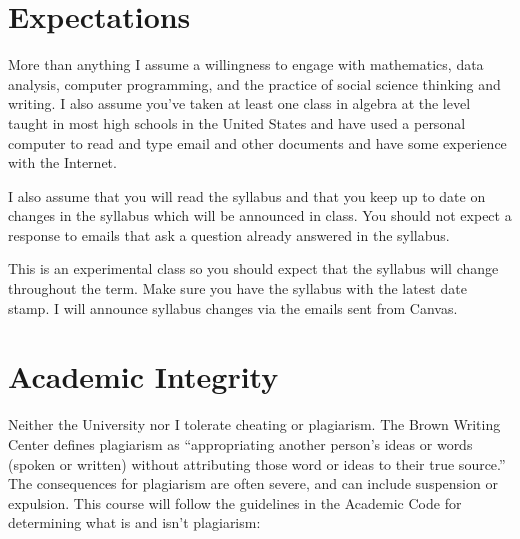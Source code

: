 \section{Expectations}

More than anything I assume a willingness to engage with mathematics, data analysis, computer programming, and the practice of social science thinking and writing. I also assume you've taken at least one class in algebra at the level taught in most high schools in the United States and have used a personal computer to read and type email and other documents and have some experience with the Internet. 

I also assume that you will read the syllabus and that you keep up to date on changes in the syllabus which will be announced in class. You should not expect a response to emails that ask a question already answered in the syllabus. 

This is an experimental class so you should expect that the syllabus will change throughout the term. Make sure you have the syllabus with the latest date stamp. I will announce syllabus changes via the emails sent from Canvas. 


\section{Academic Integrity}

Neither the University nor I tolerate cheating or plagiarism. The Brown Writing Center defines plagiarism as ``appropriating another person's ideas or words (spoken or written) without attributing those word or ideas to their true source.'' The consequences for plagiarism are often severe, and can include suspension or expulsion. This course will follow the guidelines in the Academic Code for determining what is and isn't plagiarism:

